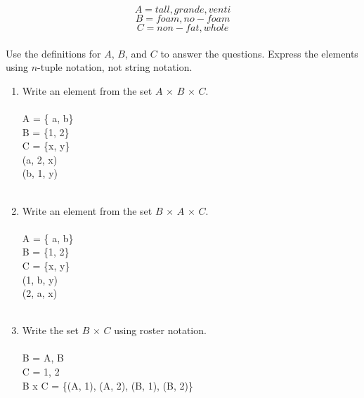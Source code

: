 \[A = {tall, grande, venti}\]
\[B = {foam, no-foam}\]
\[C = {non-fat, whole}\]\\
Use the definitions for $A$, $B$, and $C$ to answer the questions. Express the elements using $n$-tuple notation, not string notation.\\
\begin{enumerate}[label=(\alph*)]
  \item Write an element from the set $A\, \times \,B \, \times \,C$.\\\\
A = \{ a, b\}\\
B = \{1, 2\}\\
C = \{x, y\}\\

(a, 2, x)\\
(b, 1, y)
\\\\
  \item Write an element from the set $B\, \times \,A \, \times \,C$.\\\\
A = \{ a, b\}\\
B = \{1, 2\}\\
C = \{x, y\}\\

(1, b, y)\\
(2, a, x)
\\\\
  \item Write the set $B \, \times \,C$ using roster notation.\\\\
B = A, B\\
C = 1, 2\\
B x C = \{(A, 1), (A, 2), (B, 1), (B, 2)\}

\\\\
\end{enumerate}


